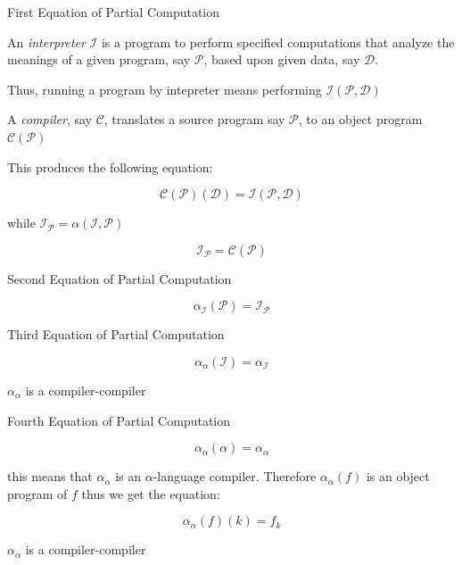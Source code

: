 \documentclass[aspectratio=169]{beamer}
\begin{document}
\begin{frame}{First Equation of Partial Computation}

    
An \textit{interpreter} $\mathcal{I}$ is a program to perform
specified computations that analyze the meanings of a given program, 
say $\mathcal{P}$, based upon given data, say $\mathcal{D}$. 

Thus, 
running a program by intepreter means performing $\mathcal{I}(\mathcal{P}, \mathcal{D})$


A \textit{compiler}, say $\mathcal{C}$, translates a source program
say $\mathcal{P}$, to an object program $\mathcal{C}(\mathcal{P})$

This produces the following equation:

\[
    \mathcal{C}(\mathcal{P})(\mathcal{D}) = \mathcal{I}(\mathcal{P},\mathcal{D})
\]

while $ \mathcal{I}_{\mathcal{P}} =  \alpha(\mathcal{I},\mathcal{P}) $

\begin{equation}
\mathcal{I}_{\mathcal{P}} =  \mathcal{C}(\mathcal{P})
\end{equation}


\end{frame}


\begin{frame}{Second Equation of Partial Computation}

    
    \begin{equation}
    \alpha_\mathcal{I}(\mathcal{P}) =  \mathcal{I}_\mathcal{P}
    \end{equation}
    
    
\end{frame}

\begin{frame}{Third Equation of Partial Computation}

    
    \begin{equation}
    \alpha_\alpha(\mathcal{I}) =  \alpha_\mathcal{I}
    \end{equation}
    
    $\alpha_\alpha$ is a compiler-compiler
    
\end{frame}


\begin{frame}{Fourth Equation of Partial Computation}

    \[
        \alpha_\alpha(\alpha)=\alpha_\alpha    
    \]

    this means that $\alpha_\alpha$ is an $\alpha$-language compiler.
    Therefore $\alpha_\alpha(f)$ is an object program of $f$
    thus we get the equation: 
    
    \begin{equation}
    \alpha_\alpha(f)(k) =  f_k
    \end{equation}
    
    $\alpha_\alpha$ is a compiler-compiler
    
\end{frame}
     
\end{document}
